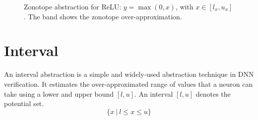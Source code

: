 \documentclass[oneside,11pt,dvipsnames]{book}
\numberwithin{equation}{section}
\theoremstyle{definition}
\theoremstyle{remark}
\newcommand{\tvn}[1]{\iftoggle{usecomment}{{\color{red}{[TVN]: #1}}}{}}
\begin{document}
\begin{figure}[h]
    \centering
    \caption{Zonotope abstraction for ReLU: $y = \max(0,x)$, with $x \in [l_x, u_x]$. The band shows the zonotope over-approximation.}
    \label{fig:relu-zonotope-abstraction}
\end{figure}


\tvn{Hai, create concrete examples with numbers to show how the abstractions work, e.g., for interval, zonotope, polytope, etc. We want to use one example to show the differences in the approximation,  not multiple examples which would be less effective.}
\section{Interval}

An interval abstraction is a simple and widely-used abstraction technique in DNN verification. It estimates the over-approximated range of values that a neuron can take using a lower and upper bound $[l, u]$. An interval $[l, u]$ denotes the potential set.
$$\{x \ | \ l \leq x \leq u\}$$
\end{document}
